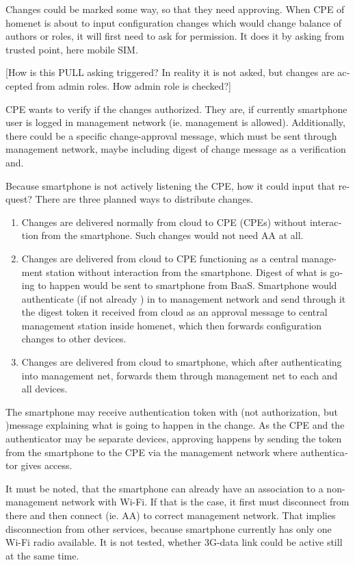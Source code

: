 \documentclass[12pt,a4paper,english]{tutthesis}
\begin{document}
\begin{otherlanguage}{english}
Changes could be marked some way, so that they need approving.
When CPE of homenet is about to input configuration
changes which would change balance of authors or roles,
it will first need to ask for permission. 
It does it by asking from trusted point, here mobile SIM. 

[How is this PULL asking triggered? In reality it is not asked, but
changes are accepted from admin roles. How admin role is checked?]

CPE wants to verify if the changes authorized. They are, if currently
smartphone user is logged in management network (ie. management is allowed).
Additionally, there could be a  specific change-approval message,
which must be sent through  management network, maybe
including digest of change message as a verification and.

Because smartphone is not actively listening the CPE, how it could
input that request? 
There are three planned ways to distribute changes.

\begin{enumerate}
\item Changes are delivered normally from cloud to CPE (CPEs) without
interaction  from the smartphone. Such changes would not need
AA at all.

\item Changes are delivered from cloud to CPE functioning as a central
management station without interaction from the smartphone. 
Digest of what is going to happen would be sent to smartphone from
BaaS. Smartphone would authenticate (if not already ) in to
management network and send through it the digest token it received from cloud 
as an approval message to central management station
inside homenet, which then forwards configuration changes to other devices.

\item Changes are delivered from cloud to smartphone, which after
authenticating into management net, forwards them through management
net to each and all devices.
\end{enumerate}


The smartphone may receive authentication token with (not
authorization, but )message explaining what is going to happen in the change.
As the CPE and the authenticator may be separate devices, approving
happens by sending the token from the smartphone to the CPE via the
management network where authenticator gives access.

It must be noted, that the smartphone can already have an association
to a non-management network with Wi-Fi. If that is the case, it first
must disconnect from there and then connect (ie. AA) to correct management
network. That implies disconnection from other services, because 
smartphone currently has only one Wi-Fi radio available. 
It is not tested, whether 3G-data link could be active still at the
same time.




\end{otherlanguage}
\end{document}
